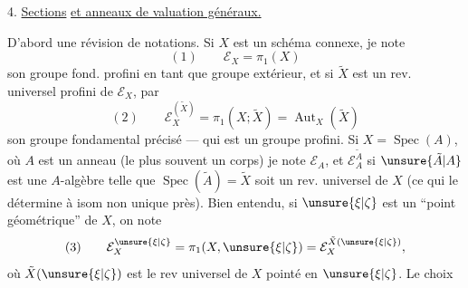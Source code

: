 4. \uline{Sections}  \uline{et anneaux de valuation généraux.}

D'abord une révision de notations. Si $X$ est un schéma connexe, je note 
\[
(1)\qquad \mathcal E_X=\pi_1(X)
\]
son groupe fond. profini en tant que groupe extérieur, et si $\tilde X$ est un rev. universel profini de $\mathcal E_X$, par
\[
(2)\qquad \mathcal E_X^{(\tilde X)}=\pi_1(X;\tilde X)=\operatorname{Aut}_X(\tilde X)
\]
son groupe fondamental précisé --- qui est un groupe profini. Si $X=\operatorname{Spec}(A)$, où $A$ est un anneau (le plus souvent un corps) je note $\mathcal E_A$, et $\mathcal E_A^{\tilde A}$  si $\unsure{\tilde A|A}$ est une $A$-algèbre telle que $\operatorname{Spec}(\tilde A)=\tilde X$ soit un rev. universel de $X$ (ce qui le détermine à isom non unique près). Bien entendu, si $\unsure{\xi|\zeta}$ est un ``point géométrique'' de $X$, on note
\[
(3)\qquad \mathcal E_X^{\unsure{\xi|\zeta}}=\pi_1(X,\unsure{\xi|\zeta})=\mathcal E_X^{\tilde X(\unsure{\xi|\zeta})},
\]
où $\tilde X(\unsure{\xi|\zeta})$ est le rev universel de $X$ pointé en $\unsure{\xi|\zeta}$. Le choix
